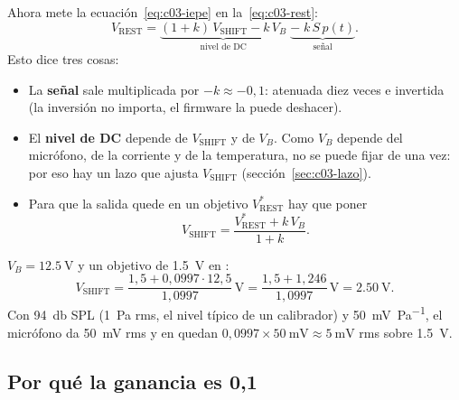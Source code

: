 Ahora mete la ecuación~\eqref{eq:c03-iepe} en la~\eqref{eq:c03-rest}:
\begin{equation*}
  V_{\mathrm{REST}} = \underbrace{(1+k)\,V_{\mathrm{SHIFT}} - k\,V_B}_{\text{nivel de DC}}
  \;\underbrace{-\;k\,S\,p(t)}_{\text{señal}}.
\end{equation*}
Esto dice tres cosas:
\begin{itemize}
  \item La \textbf{señal} sale multiplicada por $-k \approx -0{,}1$: atenuada diez veces e invertida (la inversión no
        importa, el firmware la puede deshacer).
  \item El \textbf{nivel de DC} depende de $V_{\mathrm{SHIFT}}$ y de $V_B$. Como $V_B$ depende del micrófono, de la
        corriente y de la temperatura, no se puede fijar de una vez: por eso hay un lazo que ajusta
        $V_{\mathrm{SHIFT}}$ (sección~\ref{sec:c03-lazo}).
  \item Para que la salida quede en un objetivo $V_{\mathrm{REST}}^{*}$ hay que poner
        \begin{equation}
          V_{\mathrm{SHIFT}} = \frac{V_{\mathrm{REST}}^{*} + k\,V_B}{1+k}.
          \label{eq:c03-vshift}
        \end{equation}
\end{itemize}

\begin{calculo}
$V_B = \SI{12.5}{\volt}$  y un objetivo de \SI{1.5}{\volt} en :
\begin{equation*}
  V_{\mathrm{SHIFT}} = \frac{1{,}5 + 0{,}0997\cdot 12{,}5}{1{,}0997}\,\si{\volt} = \frac{1{,}5 + 1{,}246}{1{,}0997}\,\si{\volt}
  = \SI{2.50}{\volt}.
\end{equation*}
Con \SI{94}{\decibel} SPL (\SI{1}{\pascal} rms, el nivel típico de un calibrador) y \SI{50}{\milli\volt\per\pascal},
el micrófono da \SI{50}{\milli\volt} rms y en  quedan
$0{,}0997\times\SI{50}{\milli\volt} \approx \SI{5}{\milli\volt}$ rms sobre \SI{1.5}{\volt}.
\end{calculo}

\subsection{Por qué la ganancia es 0,1}


